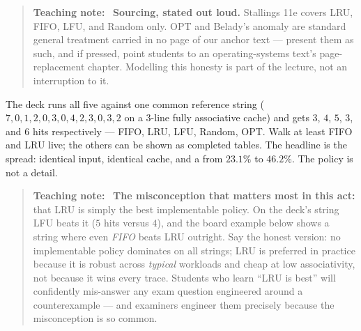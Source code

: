 \documentclass[11pt]{article}
\newenvironment{teachingaside}{\begin{quote}\small\color{primary-gold}\textbf{Teaching note:}\ }{\end{quote}}
\begin{document}
\begin{teachingaside}
\textbf{Sourcing, stated out loud.} Stallings 11e covers LRU, FIFO, LFU, and Random only. OPT and Belady's anomaly are standard general treatment carried in no page of our anchor text --- present them as such, and if pressed, point students to an operating-systems text's page-replacement chapter. Modelling this honesty is part of the lecture, not an interruption to it.
\end{teachingaside}

The deck runs all five against one common reference string ($7, 0, 1, 2, 0, 3, 0, 4, 2, 3, 0, 3, 2$ on a 3-line fully associative cache) and gets $3$, $4$, $5$, $3$, and $6$ hits respectively --- FIFO, LRU, LFU, Random, OPT. Walk at least FIFO and LRU live; the others can be shown as completed tables. The headline is the spread: identical input, identical cache, and a  from $23.1\%$ to $46.2\%$. The policy is not a detail.

\begin{teachingaside}
\textbf{The misconception that matters most in this act:} that LRU is simply the best implementable policy. On the deck's string LFU beats it ($5$ hits versus $4$), and the board example below shows a string where even \emph{FIFO} beats LRU outright. Say the honest version: no implementable policy dominates on all strings; LRU is preferred in practice because it is robust across \emph{typical} workloads and cheap at low associativity, not because it wins every trace. Students who learn ``LRU is best'' will confidently mis-answer any exam question engineered around a counterexample --- and examiners engineer them precisely because the misconception is so common.
\end{teachingaside}
\end{document}
